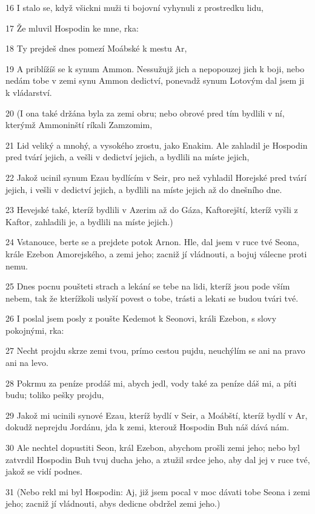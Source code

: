 \par 16 I stalo se, když všickni muži ti bojovní vyhynuli z prostredku lidu,
\par 17 Že mluvil Hospodin ke mne, rka:
\par 18 Ty prejdeš dnes pomezí Moábské k mestu Ar,
\par 19 A priblížíš se k synum Ammon. Nessužujž jich a nepopouzej jich k boji, nebo nedám tobe v zemi synu Ammon dedictví, ponevadž synum Lotovým dal jsem ji k vládarství.
\par 20 (I ona také držána byla za zemi obru; nebo obrové pred tím bydlili v ní, kterýmž Ammoninští ríkali Zamzomim,
\par 21 Lid veliký a mnohý, a vysokého zrostu, jako Enakim. Ale zahladil je Hospodin pred tvárí jejich, a vešli v dedictví jejich, a bydlili na míste jejich,
\par 22 Jakož ucinil synum Ezau bydlícím v Seir, pro než vyhladil Horejské pred tvárí jejich, i vešli v dedictví jejich, a bydlili na míste jejich až do dnešního dne.
\par 23 Hevejské také, kteríž bydlili v Azerim až do Gáza, Kaftorejští, kteríž vyšli z Kaftor, zahladili je, a bydlili na míste jejich.)
\par 24 Vstanouce, berte se a prejdete potok Arnon. Hle, dal jsem v ruce tvé Seona, krále Ezebon Amorejského, a zemi jeho; zacniž jí vládnouti, a bojuj válecne proti nemu.
\par 25 Dnes pocnu poušteti strach a lekání se tebe na lidi, kteríž jsou pode vším nebem, tak že kterížkoli uslyší povest o tobe, trásti a lekati se budou tvári tvé.
\par 26 I poslal jsem posly z poušte Kedemot k Seonovi, králi Ezebon, s slovy pokojnými, rka:
\par 27 Necht projdu skrze zemi tvou, prímo cestou pujdu, neuchýlím se ani na pravo ani na levo.
\par 28 Pokrmu za peníze prodáš mi, abych jedl, vody také za peníze dáš mi, a píti budu; toliko pešky projdu,
\par 29 Jakož mi ucinili synové Ezau, kteríž bydlí v Seir, a Moábští, kteríž bydlí v Ar, dokudž neprejdu Jordánu, jda k zemi, kterouž Hospodin Buh náš dává nám.
\par 30 Ale nechtel dopustiti Seon, král Ezebon, abychom prošli zemi jeho; nebo byl zatvrdil Hospodin Buh tvuj ducha jeho, a ztužil srdce jeho, aby dal jej v ruce tvé, jakož se vidí podnes.
\par 31 (Nebo rekl mi byl Hospodin: Aj, již jsem pocal v moc dávati tobe Seona i zemi jeho; zacniž jí vládnouti, abys dedicne obdržel zemi jeho.)
